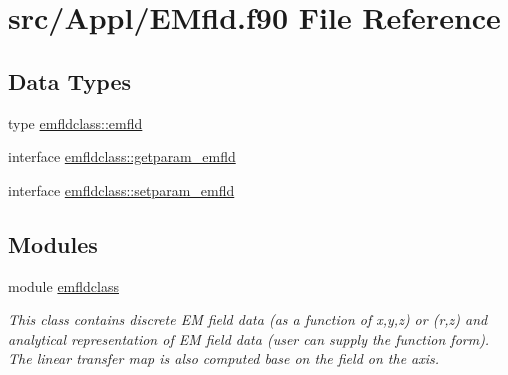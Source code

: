 \hypertarget{_e_mfld_8f90}{}\section{src/\+Appl/\+E\+Mfld.f90 File Reference}
\label{_e_mfld_8f90}
\subsection*{Data Types}
\begin{DoxyCompactItemize}
\item 
type \mbox{\hyperlink{namespaceemfldclass_structemfldclass_1_1emfld}{emfldclass\+::emfld}}
\item 
interface \mbox{\hyperlink{interfaceemfldclass_1_1getparam__emfld}{emfldclass\+::getparam\+\_\+emfld}}
\item 
interface \mbox{\hyperlink{interfaceemfldclass_1_1setparam__emfld}{emfldclass\+::setparam\+\_\+emfld}}
\end{DoxyCompactItemize}
\subsection*{Modules}
\begin{DoxyCompactItemize}
\item 
module \mbox{\hyperlink{namespaceemfldclass}{emfldclass}}
\begin{DoxyCompactList}\small\item\em This class contains discrete EM field data (as a function of x,y,z) or (r,z) and analytical representation of EM field data (user can supply the function form). The linear transfer map is also computed base on the field on the axis. \end{DoxyCompactList}\end{DoxyCompactItemize}
